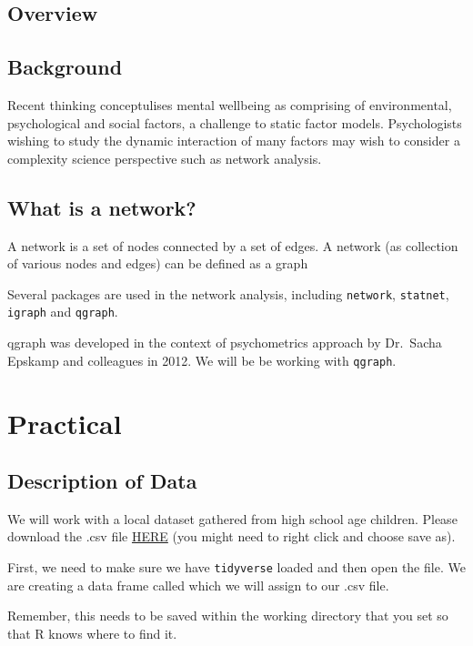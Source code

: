 \documentclass[]{book}
\begin{document}
\section{Overview}\label{overview-3}

\section{Background}\label{background}

Recent thinking conceptulises mental wellbeing as comprising of
environmental, psychological and social factors, a challenge to static
factor models. Psychologists wishing to study the dynamic interaction of
many factors may wish to consider a complexity science perspective such
as network analysis.

\section{What is a network?}\label{what-is-a-network}

A network is a set of nodes connected by a set of edges. A network (as
collection of various nodes and edges) can be defined as a graph

Several packages are used in the network analysis, including
\texttt{network}, \texttt{statnet}, \texttt{igraph} and \texttt{qgraph}.

qgraph was developed in the context of psychometrics approach by
Dr.~Sacha Epskamp and colleagues in 2012. We will be be working with
\texttt{qgraph}.

\chapter{Practical}\label{practical}

\section{Description of Data}\label{description-of-data}

We will work with a local dataset gathered from high school age
children. Please download the .csv file
\href{data/networkdataset.csv}{HERE} (you might need to right click and
choose save as).

First, we need to make sure we have \texttt{tidyverse} loaded and then
open the file. We are creating a data frame called which we will assign
to our .csv file.

Remember, this needs to be saved within the working directory that you
set so that R knows where to find it.
\end{document}
